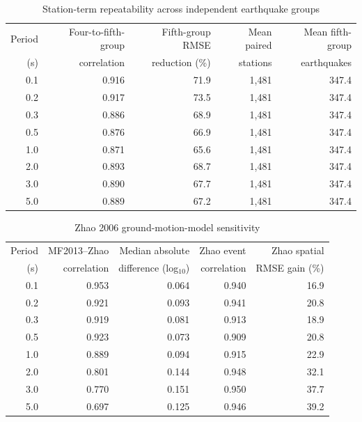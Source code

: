 \documentclass[10pt]{article}
\begin{document}
\begin{table}[H]
\centering
\caption{Station-term repeatability across independent earthquake groups}
\small
\begin{tabular}{rrrrr}
\toprule
Period & Four-to-fifth-group & Fifth-group RMSE & Mean paired & Mean fifth-group \\
(s) & correlation & reduction (\%) & stations & earthquakes \\
\midrule
0.1 & 0.916 & 71.9 & 1,481 & 347.4 \\
0.2 & 0.917 & 73.5 & 1,481 & 347.4 \\
0.3 & 0.886 & 68.9 & 1,481 & 347.4 \\
0.5 & 0.876 & 66.9 & 1,481 & 347.4 \\
1.0 & 0.871 & 65.6 & 1,481 & 347.4 \\
2.0 & 0.893 & 68.7 & 1,481 & 347.4 \\
3.0 & 0.890 & 67.7 & 1,481 & 347.4 \\
5.0 & 0.889 & 67.2 & 1,481 & 347.4 \\
\bottomrule
\end{tabular}
\end{table}

\begin{table}[H]
\centering
\caption{Zhao 2006 ground-motion-model sensitivity}
\small
\begin{tabular}{rrrrr}
\toprule
Period & MF2013--Zhao & Median absolute & Zhao event & Zhao spatial \\
(s) & correlation & difference (log$_{10}$) & correlation & RMSE gain (\%) \\
\midrule
0.1 & 0.953 & 0.064 & 0.940 & 16.9 \\
0.2 & 0.921 & 0.093 & 0.941 & 20.8 \\
0.3 & 0.919 & 0.081 & 0.913 & 18.9 \\
0.5 & 0.923 & 0.073 & 0.909 & 20.8 \\
1.0 & 0.889 & 0.094 & 0.915 & 22.9 \\
2.0 & 0.801 & 0.144 & 0.948 & 32.1 \\
3.0 & 0.770 & 0.151 & 0.950 & 37.7 \\
5.0 & 0.697 & 0.125 & 0.946 & 39.2 \\
\bottomrule
\end{tabular}
\end{table}
\end{document}
